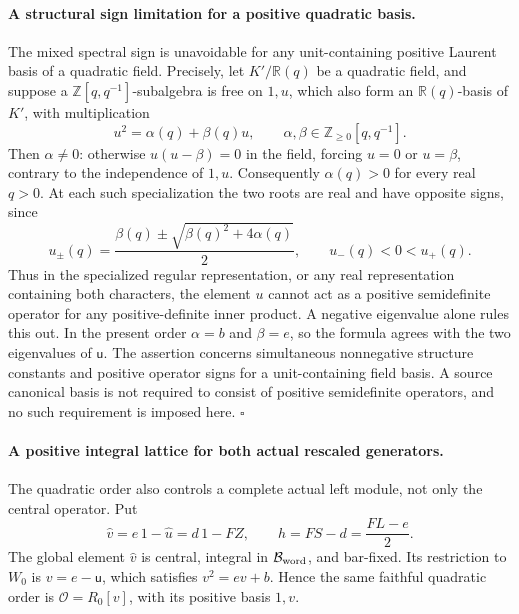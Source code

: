 \documentclass[11pt,a4paper]{article}
\begin{document}
\paragraph{A structural sign limitation for a positive quadratic basis.}
The mixed spectral sign is unavoidable for any unit-containing
positive Laurent basis of a quadratic field. Precisely, let
$K'/\mathbb R(q)$ be a quadratic field, and suppose a
$\mathbb Z[q,q^{-1}]$-subalgebra is free on $1,u$, which
also form an $\mathbb R(q)$-basis of $K'$, with multiplication
\[
        u^2=\alpha(q)+\beta(q)u,
        \qquad
        \alpha,\beta\in\mathbb Z_{\ge0}[q,q^{-1}].
                                                               \tag{P-F52at}
\]
Then $\alpha\ne0$: otherwise $u(u-\beta)=0$ in the field,
forcing $u=0$ or $u=\beta$, contrary to the independence of
$1,u$. Consequently $\alpha(q)>0$ for every real $q>0$.
At each such specialization the two roots are real and have
opposite signs, since
\[
   u_\pm(q)=\frac{\beta(q)\pm
                     \sqrt{\beta(q)^2+4\alpha(q)}}2,
   \qquad u_-(q)<0<u_+(q).
                                                               \tag{P-F52au}
\]
Thus in the specialized regular representation, or any real
representation containing both characters, the element $u$
cannot act as a positive semidefinite operator for any
positive-definite inner product. A negative eigenvalue
alone rules this out. In the present order $\alpha=b$ and
$\beta=e$, so the formula agrees with the two eigenvalues
of $\mathsf u$. The assertion concerns simultaneous
nonnegative structure constants and positive operator
signs for a unit-containing field basis. A source canonical
basis is not required to consist of positive semidefinite
operators, and no such requirement is imposed here.
\hfill$\square$

\paragraph{A positive integral lattice for both actual rescaled generators.}
The quadratic order also controls a complete actual left module,
not only the central operator. Put
\[
 \widehat v=e\,1-\widehat u=d\,1-FZ,\qquad
 h=FS-d=\frac{FL-e}{2}.
                                                               \tag{P-F52av}
\]
The global element $\widehat v$ is central, integral in
$\mathcal B_{\rm word}$, and bar-fixed. Its restriction to
$W_0$ is $v=e-\mathsf u$, which satisfies
$v^2=ev+b$. Hence the same faithful quadratic order is
$\mathcal O=R_0[v]$, with its positive basis $1,v$.
\end{document}
